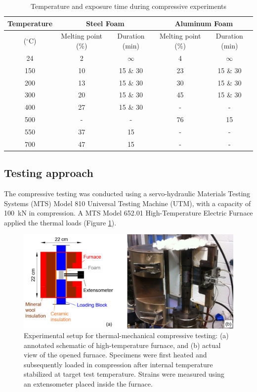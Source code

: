 \documentclass[review]{elsarticle}
\begin{document}
\begin{table}[htbp]
	\centering
	\caption{Temperature and exposure time during compressive experiments}
	\begin{tabular}{ccccc}
		\toprule
		{Temperature} & \multicolumn{2}{c}{Steel Foam}  & \multicolumn{2}{c}{Aluminum Foam} \\
		\midrule
		($^{\circ}\mathrm{C}$) & Melting point (\%) & Duration (min) & Melting point (\%) & Duration (min) \\
		\midrule
		24    & 2     & $\infty$     & 4     & $\infty$ \\
		150   & 10    & 15 \& 30 & 23    & 15 \& 30 \\
		200   & 13    & 15 \& 30 & 30    & 15 \& 30 \\
		300   & 20    & 15 \& 30 & 45    & 15 \& 30 \\
		400   & 27    & 15 \& 30 & -     & - \\
		500   & -     & -     & 76    & 15 \\
		550   & 37    & 15    & -     & - \\
		700   & 47    & 15    & -     & - \\
		\bottomrule
	\end{tabular}%
	\label{Tab1}%
\end{table}%

\subsection{Testing approach}

The compressive testing was conducted using a servo-hydraulic Materials Testing Systems (MTS) Model 810 Universal Testing Machine (UTM), with a capacity of 100~kN in compression. A MTS Model 652.01 High-Temperature Electric Furnace applied the thermal loads (Figure \ref{MTSFurnace}).

\begin{figure}[htbp]
	\begin{center}
		\includegraphics[width=0.95\linewidth]{Tex-Figures/Fig06.png}
		\caption{Experimental setup for thermal-mechanical compressive testing: (a) annotated schematic of high-temperature furnace, and (b) actual view of the opened furnace. Specimens were first heated and subsequently loaded in compression after internal temperature stabilized at target test temperature. Strains were measured using an extensometer placed inside the furnace.}
		\label{MTSFurnace}
	\end{center}
\end{figure}
\end{document}
